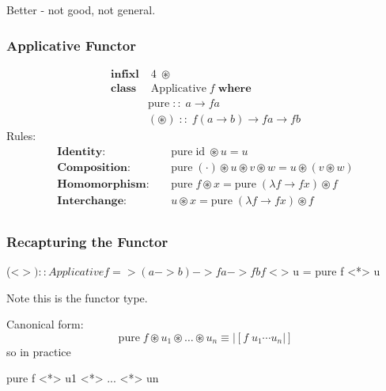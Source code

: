 \documentclass[18pt]{beamer}
\begin{document}
\begin{frame}[fragile]
Better - not good, not general.
\end{frame}

\begin{frame}[fragile] \frametitle{Applicative Functor}

\begin{align*}
  \mathbf{infixl} & \; 4 \; \circledast\\
  \mathbf{class} & \; \mathrm{Applicative} \; f \; \mathbf{where}\\
  \quad & \mathrm{pure} \; :: \; a \rightarrow f a\\
  \quad & (\circledast) \; :: \; f (a \rightarrow b) \rightarrow f a
\rightarrow f b
\end{align*}
Rules:
\begin{align*}
  \mathbf{Identity:} \quad & \mathrm{pure} \; \mathrm{id} \;
  \circledast u = u\\
  \mathbf{Composition:} \quad & \mathrm{pure} \; (\cdot) \circledast u
  \circledast v \circledast w = u \circledast (v \circledast w)\\
  \mathbf{Homomorphism:} \quad & \mathrm{pure} \; f \circledast x =
  \mathrm{pure} \; (\lambda f \rightarrow f x) \circledast f\\
  \mathbf{Interchange:} \quad & u \circledast x = \mathrm{pure} \;
  (\lambda f \rightarrow f x) \circledast f\\
\end{align*}
\end{frame}

\begin{frame}[fragile] \frametitle{Recapturing the Functor}
  \begin{code}
    (<$>) :: Applicative f =>
          (a -> b) -> f a -> f b
    f <$> u = pure f <*> u
  \end{code}
  Note this is the functor type.
\end{frame}
\begin{frame}[fragile]
Canonical form:\\
\begin{equation*}
\mathrm{pure}\; f \circledast u_1 \circledast \ldots \circledast u_n \equiv |[f
\; u_1 \dotsb u_n|]
\end{equation*}
so in practice\\
\begin{code}
pure f <*> u1 <*> ... <*> un
\end{code}
\end{frame}
\end{document}
